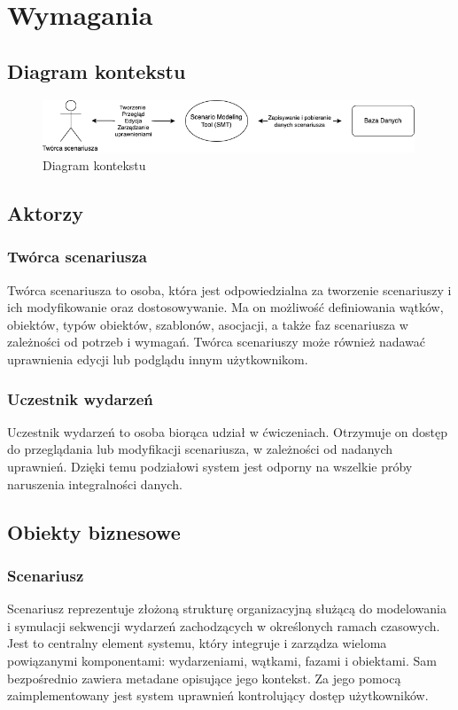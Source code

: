 \chapter{Wymagania}

\section{Diagram kontekstu}
\begin{figure}[h!]
    \centering
    \includegraphics[width=0.99\textwidth]{resources/local/diagram-kontekstu.png}
    \caption{Diagram kontekstu}
\end{figure}

\section{Aktorzy}

\subsection{Twórca scenariusza}
Twórca scenariusza to osoba, która jest odpowiedzialna za tworzenie scenariuszy i ich modyfikowanie oraz dostosowywanie. 
Ma on możliwość definiowania wątków, obiektów, typów obiektów, szablonów, asocjacji, a także faz scenariusza w zależności 
od potrzeb i wymagań. Twórca scenariuszy może również nadawać uprawnienia edycji lub podglądu innym użytkownikom.

\subsection{Uczestnik wydarzeń}
Uczestnik wydarzeń to osoba biorąca udział w ćwiczeniach. Otrzymuje on dostęp do przeglądania lub modyfikacji scenariusza, 
w zależności od nadanych uprawnień. Dzięki temu podziałowi system jest odporny na wszelkie próby naruszenia integralności danych.

\section{Obiekty biznesowe}

\subsection{Scenariusz}
Scenariusz reprezentuje złożoną strukturę organizacyjną służącą do modelowania i symulacji sekwencji wydarzeń zachodzących 
w określonych ramach czasowych. Jest to centralny element systemu, który integruje i zarządza wieloma powiązanymi komponentami: 
wydarzeniami, wątkami, fazami i obiektami. Sam bezpośrednio zawiera metadane opisujące jego kontekst. 
Za jego pomocą zaimplementowany jest system uprawnień kontrolujący dostęp użytkowników.

